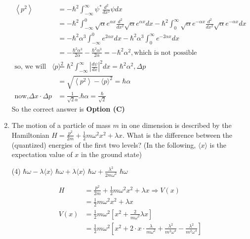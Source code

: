 \begin{enumerate}
\begin{answer}
\begin{align*}
\left\langle p^{2}\right\rangle&=-\hbar^{2} \int_{-\infty}^{\infty} \psi^{*} \frac{d^{2}}{d x^{2}} \psi d x\\&=-\hbar^{2} \int_{-\infty}^{0} \sqrt{\alpha} e^{\alpha x} \frac{d^{2}}{d x^{2}} \sqrt{\alpha} e^{\alpha x} d x-\hbar^{2} \int_{0}^{\infty} \sqrt{\alpha} e^{-\alpha x} \frac{d^{2}}{d x^{2}} \sqrt{\alpha} e^{-\alpha x} d x\\
&=-\hbar^{2} \alpha^{3} \int_{-\infty}^{0} e^{2 \alpha x} d x-\hbar^{2} \alpha^{3} \int_{0}^{\infty} e^{-2 \alpha x} d x\\&=-\frac{\hbar^{2} \alpha^{3}}{2 \alpha}-\frac{\hbar^{2} \alpha^{3}}{2 \alpha}=-\hbar^{2} \alpha^{2}, \text{which is not possible}\\
\text{so, we will use the formula }\langle p\rangle^{2}&=\hbar^{2} \int_{-\infty}^{\infty}\left|\frac{d \psi}{d x}\right|^{2} d x=\hbar^{2} \alpha^{2}, \Delta p\\&=\sqrt{\left\langle p^{2}\right\rangle-\langle p\rangle^{2}}=\hbar \alpha\\
\text{now,}\Delta x \cdot \Delta p&=\frac{1}{\sqrt{2} \alpha} . \hbar \alpha=\frac{\hbar}{\sqrt{2}}
\end{align*}
So the correct answer is \textbf{Option (C)}
\end{answer}
	\item The motion of a particle of mass $m$ in one dimension is described by the Hamiltonian $H=\frac{p^{2}}{2 m}+\frac{1}{2} m \omega^{2} x^{2}+\lambda x .$ What is the difference between the (quantized) energies of the first two levels? (In the following, $\langle x\rangle$ is the expectation value of $x$ in the ground state)
{	}
\begin{tasks}(4)
\task[\textbf{A.}] $\hbar \omega-\lambda\langle x\rangle$
\task[\textbf{B.}] $\hbar \omega+\lambda\langle x\rangle$
\task[\textbf{C.}] $\hbar \omega+\frac{\lambda^{2}}{2 m \omega^{2}}$
\task[\textbf{D.}] $\hbar \omega$
\end{tasks}
\begin{answer}
\begin{align*}
H&=\frac{p^{2}}{2 m}+\frac{1}{2} m \omega^{2} x^{2}+\lambda x \Rightarrow V(x)\\&=\frac{1}{2} m \omega^{2} x^{2}+\lambda x\\
V(x)&=\frac{1}{2} m \omega^{2}\left[x^{2}+\frac{2}{m \omega^{2}} \lambda x\right]\\&=\frac{1}{2} m \omega^{2}\left[x^{2}+2 \cdot x \cdot \frac{\lambda}{m \omega^{2}}+\frac{\lambda^{2}}{m^{2} \omega^{4}}-\frac{\lambda^{2}}{m^{2} \omega^{4}}\right]\\

\end{align*}
\end{answer}
\end{enumerate}
